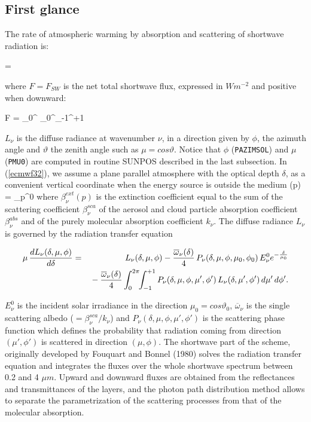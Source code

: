 %
\subsection{First glance}
%

The rate of atmospheric warming by absorption and scattering of shortwave radiation is:

%

\medskip
\be
{} =  
\label{ecmwf31}
\ee
\medskip

\noindent where $F=F_{SW}$ is the net total shortwave flux, expressed in
$W m^{-2}$ and positive when downward:

\medskip
\be
F = \int_0^\infty{} \int_0^\pi{}\int_{-1}^{+1}
\label{ecmwf32}
\ee
\medskip

$L_{\nu}$ is the diffuse radiance at wavenumber $\nu $, in a direction given by $\phi$, the azimuth angle and $\vartheta $ the zenith angle such as $\mu = cos\vartheta $. Notice that $\phi$ ({\tt PAZIMSOL}) and $\mu$ ({\tt PMU0}) are
computed in routine SUNPOS described in the last subsection. In (\ref{ecmwf32}),
we assume a plane parallel atmosphere with the optical depth $\delta$, as
a convenient vertical coordinate when the energy source is outside the medium
\medskip
\be
\delta(p) = \int_p^0
\label{ecmwf33}
\ee
\medskip
\noindent where $\beta_{\nu}^{ext}(p)$ is the extinction coefficient equal to
the sum of the scattering coefficient $\beta_{\nu}^{sca}$ of the aerosol and
cloud particle absorption coefficient $\beta_{\nu}^{abs}$ and of the purely molecular absorption coefficient $k_{\nu}$. The diffuse radiance $L_{\nu}$ is governed by the radiation transfer equation

\medskip
\begin{eqnarray}\label{ecmwf34}
\mu \, \frac{dL_{\nu}(\delta,\mu,\phi)}{d\delta} &=&
L_{\nu}(\delta,\mu,\phi) - \frac{\overline{\omega}_{\nu}(\delta)}{4} \, P_{\nu}(\delta,\mu,\phi,\mu_0,\phi_0) \, E_{\nu}^0 e^{-\frac{\delta}{\mu_0}} \cr
                                                 & &
\mbox{}- \frac{\overline{\omega}_{\nu}(\delta)}{4} \int_0^{2\pi}\!\!\int_{-1}^{+1}{P_{\nu}(\delta,\mu,\phi,\mu',\phi') \, L_{\nu}(\delta,\mu',\phi') \, d\mu' \, d\phi'}.
\end{eqnarray}
\medskip

$E_{\nu}^0$ is the incident solar irradiance in the direction $\mu_0 = cos\vartheta _0$, $\overline{\omega}_{\nu}$ is the single scattering albedo ($= \beta_{\nu}^{sca} / k_\nu$) and $P_{\nu}(\delta,\mu,\phi,\mu',\phi')$ is the scattering phase function which defines the probability that radiation coming from direction $(\mu',\phi')$ is scattered in direction $(\mu,\phi)$.
The shortwave part of the scheme, originally developed by Fouquart and Bonnel (1980) solves the radiation transfer equation and integrates the fluxes over the whole shortwave spectrum between 0.2 and 4 $\mu m$. Upward and downward fluxes are obtained from the reflectances and transmittances of the layers, and the photon path distribution method allows to separate the parametrization of the scattering processes from that of the molecular absorption.

